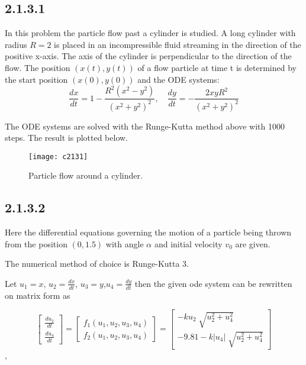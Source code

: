\documentclass[11pt,a4paper,roman]{scrartcl}
\begin{document}
\subsection*{2.1.3.1}
In this problem the particle flow past a cylinder is studied. A long cylinder with radius $R=2$ is placed in an incompressible fluid streaming in the direction of the positive x-axis. The axis of the cylinder is perpendicular to the direction of the flow. The position $(x(t), y(t))$ of a flow particle at time t is determined by the start position $(x(0), y(0))$ and the ODE systems:
\begin{equation}
\frac{dx}{dt} = 1- \frac{R^2(x^2-y^2)}{(x^2+y^2)^2}, \quad \frac{dy}{dt} = -\frac{2xyR^2}{(x^2+y^2)^2}
\end{equation}

The ODE systems are solved with the Runge-Kutta method above with 1000 steps. The result is plotted below. 

\begin{figure}[H]
\texttt{[image: c2131]}
\caption{Particle flow around a cylinder.}
\end{figure}


\newpage
\subsection*{2.1.3.2}


Here the differential equations governing the motion of a particle being thrown from the position $(0,1.5)$ with angle $\alpha$ and initial velocity $v_0$ are given. 

The numerical method of choice is Runge-Kutta 3.

Let $u_1=x$, $u_2=\frac{dx}{dt}$, $u_3=y$,$u_4=\frac{dy}{dt}$ then the given ode system can be rewritten on matrix form as 

\begin{equation}
\begin{bmatrix}
\frac{du_2}{dt} \\
\frac{du_4}{dt}
\end{bmatrix} =
\begin{bmatrix}
f_1(u_1,u_2,u_3,u_4) \\
f_2(u_1,u_2,u_3,u_4)
\end{bmatrix}=
\begin{bmatrix}
-ku_2\sqrt[]{u_2^2+u_4^2} \\
-9.81-k|u_4|\sqrt[]{u_2^2+u_4^2}
\end{bmatrix}
\end{equation},
\end{document}

